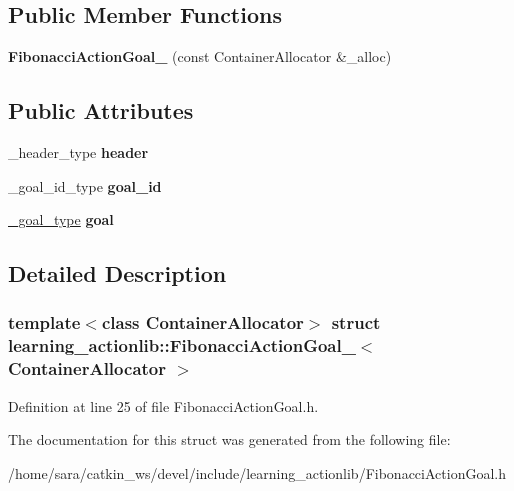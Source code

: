 \subsection*{Public Member Functions}
\begin{DoxyCompactItemize}
\item 
\mbox{\label{structlearning__actionlib_1_1FibonacciActionGoal___a73fc691f8f56ccc1c492995fbe3f4d0b}} 
{\bfseries Fibonacci\+Action\+Goal\+\_\+} (const Container\+Allocator \&\+\_\+alloc)
\end{DoxyCompactItemize}
\subsection*{Public Attributes}
\begin{DoxyCompactItemize}
\item 
\mbox{\label{structlearning__actionlib_1_1FibonacciActionGoal___aa3b94293b27d4f4804865fe30c51d681}} 
\+\_\+header\+\_\+type {\bfseries header}
\item 
\mbox{\label{structlearning__actionlib_1_1FibonacciActionGoal___a8f253dc8a7b1ef393ee8023606b1550a}} 
\+\_\+goal\+\_\+id\+\_\+type {\bfseries goal\+\_\+id}
\item 
\mbox{\label{structlearning__actionlib_1_1FibonacciActionGoal___aca04cae689f2b9ec3355b0d86f91a7ac}} 
\hyperlink{structlearning__actionlib_1_1FibonacciGoal__}{\+\_\+goal\+\_\+type} {\bfseries goal}
\end{DoxyCompactItemize}


\subsection{Detailed Description}
\subsubsection*{template$<$class Container\+Allocator$>$\newline
struct learning\+\_\+actionlib\+::\+Fibonacci\+Action\+Goal\+\_\+$<$ Container\+Allocator $>$}



Definition at line 25 of file Fibonacci\+Action\+Goal.\+h.



The documentation for this struct was generated from the following file\+:\begin{DoxyCompactItemize}
\item 
/home/sara/catkin\+\_\+ws/devel/include/learning\+\_\+actionlib/Fibonacci\+Action\+Goal.\+h\end{DoxyCompactItemize}
